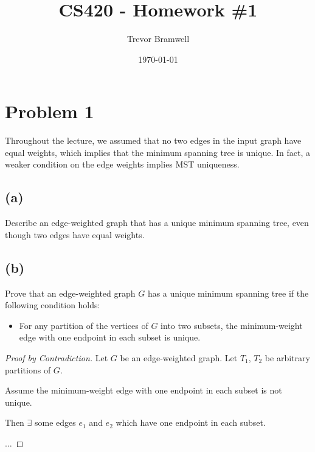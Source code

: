 \documentclass[12pt]{article}
\title{CS420 - Homework \#1}
\author{Trevor Bramwell}
\date{\today}
\begin{document}
\maketitle

\section*{Problem 1}

Throughout the lecture, we assumed that no two edges in the input graph
have equal weights, which implies that the minimum spanning tree is
unique. In fact, a weaker condition on the edge weights implies MST
uniqueness.

\subsection*{(a)}
Describe an edge-weighted graph that has a unique minimum spanning tree,
even though two edges have equal weights.

\begin{center}
\end{center}

\subsection*{(b)}
Prove that an edge-weighted graph $G$ has a unique minimum spanning tree
if the following condition holds:

\begin{itemize}
    \item For any partition of the vertices of $G$ into two subsets, the
          minimum-weight edge with one endpoint in each subset is unique.
\end{itemize}

\begin{proof}[Proof by Contradiction]
    Let $G$ be an edge-weighted graph. Let $T_1$, $T_2$ be arbitrary
    partitions of $G$.
    
    Assume the minimum-weight edge with one endpoint in each subset is
    not unique.

    Then $\exists$ some edges $e_1$ and $e_2$ which have one endpoint in each
    subset.

    $\ldots$

\end{proof}
\end{document}
